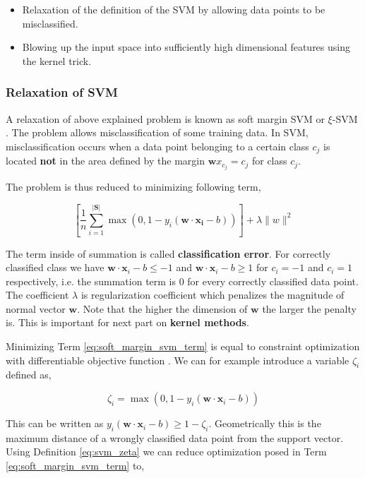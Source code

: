 \documentclass[pdftex,12pt,a4paper]{report}
\begin{document}
\begin{itemize}
\item Relaxation of the definition of the SVM by allowing data points to be misclassified.
\item Blowing up the input space into sufficiently high dimensional features using the kernel trick.
\end{itemize}

\subsubsection*{Relaxation of SVM}

A relaxation of above explained problem is known as soft margin SVM or $\xi$-SVM \cite{cortes1995support}. The problem allows misclassification of some training data. In SVM, misclassification occurs when a data point belonging to a certain class $c_j$ is located \textbf{not} in the area defined by the margin $\mathbf{w} x_{c_j} = c_j$ for class $c_j$.

The problem is thus reduced to minimizing following term,

\begin{equation}
\left[\frac{1}{n} \sum_{i=1}^{\vert \mathbf{S} \vert} \max\left(0, 1 - y_i(\mathbf{w} \cdot \mathbf{x_i} - b)\right) \right] + \lambda\| w \|^2
\label{eq:soft_margin_svm_term}
\end{equation}

The term inside of summation is called \textbf{classification error}. For correctly classified class we have $\mathbf{w} \cdot \mathbf{x}_i - b \leq -1$ and $\mathbf{w} \cdot \mathbf{x}_i - b \geq 1$ for $c_i = -1$ and $c_i = 1$ respectively, i.e. the summation term is $0$ for every correctly classified data point. The coefficient $\lambda$ is regularization coefficient which penalizes the magnitude of normal vector $\mathbf{w}$. Note that the higher the dimension of $\mathbf{w}$ the larger the penalty is. This is important for next part on \textbf{kernel methods}.

Minimizing Term \ref{eq:soft_margin_svm_term} is equal to constraint optimization with differentiable objective function \cite{nocedal2006numerical}. We can for example introduce a variable $\zeta_i$ defined as,

\begin{equation}
\zeta_i = \max(0, 1 - y_i(\mathbf{w} \cdot \mathbf{x}_i - b))
\label{eq:svm_zeta}
\end{equation}

This can be written as $y_i(\mathbf{w} \cdot \mathbf{x}_i - b) \geq 1 - \zeta_i$. Geometrically this is the maximum distance of a wrongly classified data point from the support vector. Using Definition \ref{eq:svm_zeta} we can reduce optimization posed in Term \ref{eq:soft_margin_svm_term} to,
\end{document}
